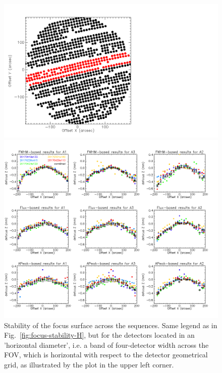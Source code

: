 \begin{figure}  
  \includegraphics[trim={-2cm, 2cm, 0, 2cm}, clip, angle=0, scale=0.1]{Figures/fov_focus_stability_check_D2.png}
  \begin{center}
  \includegraphics[trim={0, 2cm, 0, 2cm},clip, angle=0, scale=0.45]{Figures/fov_focus_1D_Hband_5.png}
  \caption{Stability of the focus surface across the sequences. Same
    legend as in Fig.~\ref{fig:focus-stability-H}, but for the
    detectors located in an 'horizontal diameter', i.e. a band of
    four-detector width across the FOV, which is horizontal with respect to
    the detector geometrical grid, as illustrated by the plot in the
    upper left corner. }
\label{fig:focus-stability-V}
\end{center}
\end{figure}



